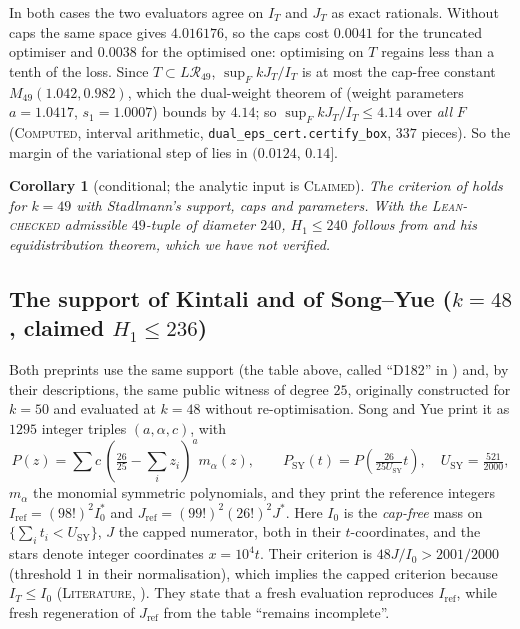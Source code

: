 \documentclass[11pt]{amsart}
\newtheorem{corollary}[theorem]{Corollary}
\theoremstyle{definition}
\theoremstyle{remark}
\newcommand{\lbl}[1]{\textup{\textsc{#1}}}
\newcommand{\R}{\mathcal{R}}
\begin{document}
In both cases the two evaluators agree on $I_T$ and $J_T$ as exact rationals.
Without caps the same space gives $4.016176$, so the caps cost $0.0041$ for the
truncated optimiser and $0.0038$ for the optimised one: optimising on $T$
regains less than a tenth of the loss. Since $T\subset L\R_{49}$,
$\sup_FkJ_T/I_T$ is at most the cap-free constant $M_{49}(1.042,0.982)$, which
the dual-weight theorem of \cite[\S4]{Kim26} (weight parameters $a=1.0417$,
$s_1=1.0007$) bounds by $4.14$; so $\sup_FkJ_T/I_T\le4.14$ over \emph{all} $F$ (\lbl{Computed}, interval
arithmetic, \texttt{dual\_eps\_cert.certify\_box}, $337$ pieces). So the
margin of the variational step of \cite{Sta26} lies in $(0.0124,\,0.14]$.

\begin{corollary}[conditional; the analytic input is \lbl{Claimed}]
The criterion of \cite[Prop.~1]{Sta26} holds for $k=49$ with Stadlmann's
support, caps and parameters. With the \lbl{Lean-checked} admissible
$49$-tuple of diameter $240$, $H_1\le240$ follows from \cite[Prop.~1]{Sta26}
and his equidistribution theorem, which we have not verified.
\end{corollary}

\subsection*{The support of Kintali and of Song--Yue ($k=48$, claimed $H_1\le236$)}
Both preprints use the same support (the table above, called ``D182'' in
\cite{Kin26}) and, by their descriptions, the same public witness of degree
$25$, originally constructed for $k=50$ and evaluated at $k=48$ without
re-optimisation. Song and Yue print it as $1295$ integer triples
$(a,\alpha,c)$, with
\[
P(z)=\sum c\,\left(\tfrac{26}{25}-\textstyle\sum_iz_i\right)^a m_\alpha(z),\qquad
P_{\mathrm{SY}}(t)=P\!\left(\tfrac{26}{25U_{\mathrm{SY}}}t\right),\quad U_{\mathrm{SY}}=\tfrac{521}{2000},
\]
$m_\alpha$ the monomial symmetric polynomials, and they print the reference
integers $I_{\mathrm{ref}}=(98!)^2I_0^\ast$ and
$J_{\mathrm{ref}}=(99!)^2(26!)^2J^\ast$. Here $I_0$ is the \emph{cap-free} mass
on $\{\sum_it_i<U_{\mathrm{SY}}\}$, $J$ the capped numerator, both in their
$t$-coordinates, and the stars denote integer
coordinates $x=10^4t$. Their criterion is $48J/I_0>2001/2000$ (threshold $1$
in their normalisation), which implies
the capped criterion because $I_T\le I_0$ (\lbl{Literature},
\cite[\S4.12, App.~A, App.~C]{SY26}). They state that a fresh evaluation
reproduces $I_{\mathrm{ref}}$, while fresh regeneration of $J_{\mathrm{ref}}$
from the table ``remains incomplete''.
\end{document}
